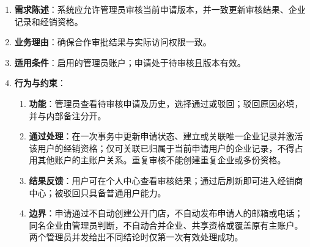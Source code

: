 \begin{enumerate}
\item {\bfseries 需求陈述}：系统应允许管理员审核当前申请版本，并一致更新审核结果、企业记录和经销资格。
\item {\bfseries 业务理由}：确保合作审批结果与实际访问权限一致。
\item {\bfseries 适用条件}：启用的管理员账户；申请处于待审核且版本有效。
\item {\bfseries 行为与约束}：
\begin{enumerate}
\item {\bfseries 功能}：管理员查看待审核申请及历史，选择通过或驳回；驳回原因必填，并与内部备注分开。
\item {\bfseries 通过处理}：在一次事务中更新申请状态、建立或关联唯一企业记录并激活该用户的经销资格；仅可关联已归属于当前申请用户的企业记录，不得占用其他账户的主账户关系。重复审核不能创建重复企业或多份资格。
\item {\bfseries 结果反馈}：用户可在个人中心查看审核结果；通过后刷新即可进入经销商中心；被驳回只具备普通用户能力。
\item {\bfseries 边界}：申请通过不自动创建公开门店，不自动发布申请人的邮箱或电话；同名企业由管理员判断，不自动合并企业、共享资格或覆盖原有主账户。两个管理员并发给出不同结论时仅第一次有效处理成功。
\end{enumerate}

\end{enumerate}


